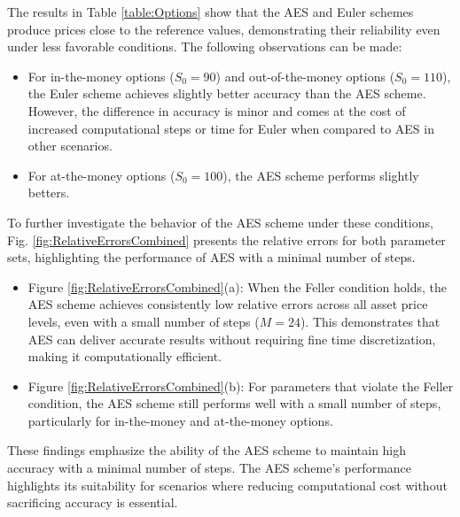 \documentclass[]{interact}
\theoremstyle{plain}%
\theoremstyle{definition}
\theoremstyle{remark}
\begin{document}
The results in Table \ref{table:Options} show that the AES and Euler schemes produce prices close to the reference values, demonstrating their reliability even under less favorable conditions. The following observations can be made:
\begin{itemize}
    \item For in-the-money options (\( S_0 = 90 \)) and out-of-the-money options (\( S_0 = 110 \)), the Euler scheme achieves slightly better accuracy than the AES scheme. However, the difference in accuracy is minor and comes at the cost of increased computational steps or time for Euler when compared to AES in other scenarios.
    
    \item For at-the-money options (\( S_0 = 100 \)), the AES scheme performs slightly betters. 
\end{itemize}

To further investigate the behavior of the AES scheme under these conditions, Fig. \ref{fig:RelativeErrorsCombined} presents the relative errors for both parameter sets, highlighting the performance of AES with a minimal number of steps.

\begin{itemize}
    \item Figure \ref{fig:RelativeErrorsCombined}(a): When the Feller condition holds, the AES scheme achieves consistently low relative errors across all asset price levels, even with a small number of steps (\( M = 24 \)). This demonstrates that AES can deliver accurate results without requiring fine time discretization, making it computationally efficient.

    \item Figure \ref{fig:RelativeErrorsCombined}(b): For parameters that violate the Feller condition, the AES scheme still performs well with a small number of steps, particularly for in-the-money and at-the-money options.
\end{itemize}

These findings emphasize the ability of the AES scheme to maintain high accuracy with a minimal number of steps. The AES scheme’s performance highlights its suitability for scenarios where reducing computational cost without sacrificing accuracy is essential.
\end{document}

